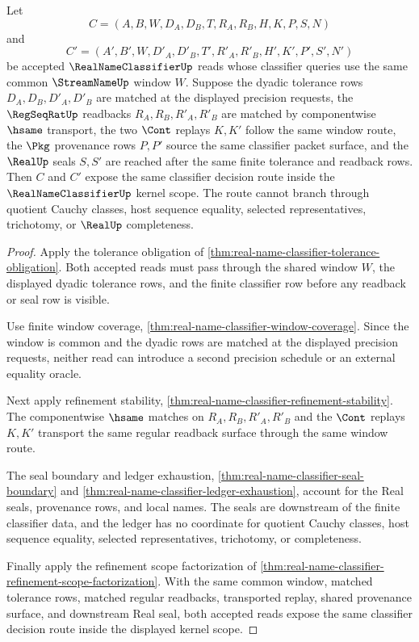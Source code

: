 \begin{theorem}
\label{thm:realnameclassifier-kernel-scope}
Let
$$
C=(A,B,W,D_A,D_B,T,R_A,R_B,H,K,P,S,N)
$$
and
$$
C'=(A',B',W,D'_A,D'_B,T',R'_A,R'_B,H',K',P',S',N')
$$
be accepted $\RealNameClassifierUp$ reads whose classifier queries use the same common $\StreamNameUp$ window $W$. Suppose the dyadic tolerance rows $D_A,D_B,D'_A,D'_B$ are matched at the displayed precision requests, the $\RegSeqRatUp$ readbacks $R_A,R_B,R'_A,R'_B$ are matched by componentwise $\hsame$ transport, the two $\Cont$ replays $K,K'$ follow the same window route, the $\Pkg$ provenance rows $P,P'$ source the same classifier packet surface, and the $\RealUp$ seals $S,S'$ are reached after the same finite tolerance and readback rows. Then $C$ and $C'$ expose the same classifier decision route inside the $\RealNameClassifierUp$ kernel scope. The route cannot branch through quotient Cauchy classes, host sequence equality, selected representatives, trichotomy, or $\RealUp$ completeness.
\end{theorem}
\begin{proof}
Apply the tolerance obligation of \autoref{thm:real-name-classifier-tolerance-obligation}. Both accepted reads must pass through the shared window $W$, the displayed dyadic tolerance rows, and the finite classifier row before any readback or seal row is visible.

Use finite window coverage, \autoref{thm:real-name-classifier-window-coverage}. Since the window is common and the dyadic rows are matched at the displayed precision requests, neither read can introduce a second precision schedule or an external equality oracle.

Next apply refinement stability, \autoref{thm:real-name-classifier-refinement-stability}. The componentwise $\hsame$ matches on $R_A,R_B,R'_A,R'_B$ and the $\Cont$ replays $K,K'$ transport the same regular readback surface through the same window route.

The seal boundary and ledger exhaustion, \autoref{thm:real-name-classifier-seal-boundary} and \autoref{thm:real-name-classifier-ledger-exhaustion}, account for the Real seals, provenance rows, and local names. The seals are downstream of the finite classifier data, and the ledger has no coordinate for quotient Cauchy classes, host sequence equality, selected representatives, trichotomy, or completeness.

Finally apply the refinement scope factorization of \autoref{thm:real-name-classifier-refinement-scope-factorization}. With the same common window, matched tolerance rows, matched regular readbacks, transported replay, shared provenance surface, and downstream Real seal, both accepted reads expose the same classifier decision route inside the displayed kernel scope.
\end{proof}

